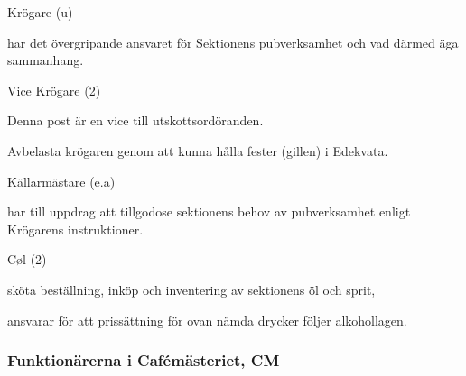 \documentclass[10pt]{article}
\begin{document}
\begin{emptylist}
    \item Krögare (u)
        \begin{dashlist}
            \item har det övergripande ansvaret för Sektionens pubverksamhet
                och vad därmed äga sammanhang.
        \end{dashlist}
    \item Vice Krögare (2)
        \begin{dashlist}
        \item Denna post är en vice till utskottsordöranden.
        \item Avbelasta krögaren genom att kunna hålla fester (gillen) i
            Edekvata.
        \end{dashlist}
    \item Källarmästare (e.a)
        \begin{dashlist}
            \item har till uppdrag att tillgodose sektionens behov av
                pubverksamhet enligt Krögarens instruktioner.
        \end{dashlist}
    \item Cøl (2)
        \begin{dashlist}
            \item sköta beställning, inköp och inventering av sektionens öl
                och sprit,
            \item ansvarar för att prissättning för ovan nämda drycker
                följer alkohollagen.
        \end{dashlist}
\end{emptylist}
\subsubsection{Funktionärerna i Cafémästeriet, CM}
\end{document}
